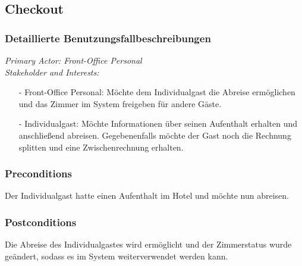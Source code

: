 \documentclass[./detailed_overview_usecases.tex]{subfiles}
\begin{document}
    \subsection{Checkout}
    \subsubsection{Detaillierte Benutzungsfallbeschreibungen}
    \textit{Primary Actor: Front-Office Personal}
    \\
    \textit{Stakeholder and Interests:}
    \begin{itemize}
        \item[-] Front-Office Personal: Möchte dem Individualgast die Abreise ermöglichen und das Zimmer im System freigeben für andere Gäste.
        \item[-] Individualgast: Möchte Informationen über seinen Aufenthalt erhalten und anschließend abreisen. Gegebenenfalls
        möchte der Gast noch die Rechnung splitten und eine Zwischenrechnung erhalten.
    \end{itemize}

    \subsubsection*{Preconditions}
    Der Individualgast hatte einen Aufenthalt im Hotel und möchte nun abreisen.

    \subsubsection*{Postconditions}
    Die Abreise des Individualgastes wird ermöglicht und der Zimmerstatus wurde geändert,
    sodass es im System weiterverwendet werden kann.
\end{document}
